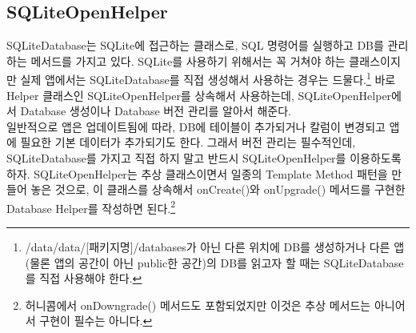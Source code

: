 
    
\begin{comment}
인덱스 문제가 있거나 테이블 조인 구조가 복잡하다면 쿼리 튜닝이 필요할 수 있다. EXPLAIN PLAN을 쓰는 방법이나 튜닝에 대한 기본 내용들은 인터넷에 많이 찾아 볼 수 있다.\\

09-05 18:47:27.335: E/Database(13396): close() was never explicitly called on database '/data/data/com.nhn.android.alarmclock/databases/alarms.db' 
09-05 18:47:27.335: E/Database(13396): android.database.sqlite.DatabaseObjectNotClosedException: Application did not close the cursor or database object that was opened here
09-05 18:47:27.335: E/Database(13396): 	at android.database.sqlite.SQLiteDatabase.<init>(SQLiteDatabase.java:1847)
09-05 18:47:27.335: E/Database(13396): 	at android.database.sqlite.SQLiteDatabase.openDatabase(SQLiteDatabase.java:820)
09-05 18:47:27.335: E/Database(13396): 	at android.database.sqlite.SQLiteDatabase.openOrCreateDatabase(SQLiteDatabase.java:854)
09-05 18:47:27.335: E/Database(13396): 	at android.database.sqlite.SQLiteDatabase.openOrCreateDatabase(SQLiteDatabase.java:847)
09-05 18:47:27.335: E/Database(13396): 	at android.app.ContextImpl.openOrCreateDatabase(ContextImpl.java:640)
09-05 18:47:27.335: E/Database(13396): 	at android.content.ContextWrapper.openOrCreateDatabase(ContextWrapper.java:203)
09-05 18:47:27.335: E/Database(13396): 	at android.database.sqlite.SQLiteOpenHelper.getWritableDatabase(SQLiteOpenHelper.java:118)
\end{comment}

\subsection{SQLiteOpenHelper}
SQLiteDatabase는 SQLite에 접근하는 클래스로, SQL 명령어를 실행하고 DB를 관리하는 메서드를 가지고 있다. 
SQLite를 사용하기 위해서는 꼭 거쳐야 하는 클래스이지만 실제 앱에서는 SQLiteDatabase를 직접 생성해서 사용하는 경우는 드물다.\footnote{/data/data/[패키지명]/databases가 아닌 다른 위치에 DB를 생성하거나 다른 앱(물론 앱의 공간이 아닌 public한 공간)의 DB를 읽고자 할 때는 SQLiteDatabase를 직접 사용해야 한다.}
바로 Helper 클래스인 SQLiteOpenHelper를 상속해서 사용하는데, SQLiteOpenHelper에서 Database 생성이나 Database 버전 관리를 알아서 해준다.\\

일반적으로 앱은 업데이트됨에 따라, DB에 테이블이 추가되거나 칼럼이 변경되고 앱에 필요한 기본 데이터가 추가되기도 한다. 
그래서 버전 관리는 필수적인데, SQLiteDatabase를 가지고 직접 하지 말고 반드시 SQLiteOpenHelper를 이용하도록 하자.
SQLiteOpenHelper는 추상 클래스이면서 일종의 Template Method 패턴을 만들어 놓은 것으로, 이 클래스를 상속해서 onCreate()와 onUpgrade() 메서드를 구현한 Database Helper를 작성하면 된다.\footnote{허니콤에서 onDowngrade() 메서드도 포함되었지만 이것은 추상 메서드는 아니어서 구현이 필수는 아니다.}\\

